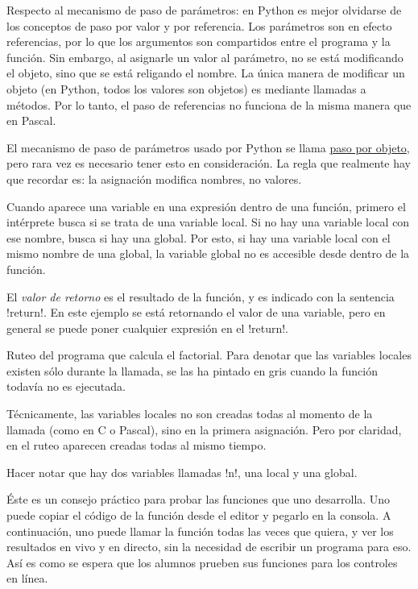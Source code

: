 \documentclass[10pt]{article}
\begin{document}
  Respecto al mecanismo de paso de parámetros:
  en Python es mejor olvidarse de los conceptos de paso por valor y por referencia.
  Los parámetros son en efecto referencias,
  por lo que los argumentos son compartidos entre el programa y la función.
  Sin embargo, al asignarle un valor al parámetro,
  no se está modificando el objeto, sino que se está religando el nombre.
  La única manera de modificar un objeto (en Python, todos los valores son objetos)
  es mediante llamadas a métodos.
  Por lo tanto, el paso de referencias no funciona de la misma manera que en Pascal.

  El mecanismo de paso de parámetros usado por Python
  se llama \href{http://effbot.org/zone/call-by-object.htm}{paso por objeto},
  pero rara vez es necesario tener esto en consideración.
  La regla que realmente hay que recordar es:
  la asignación modifica nombres, no valores.

  Cuando aparece una variable en una expresión dentro de una función,
  primero el intérprete busca si se trata de una variable local.
  Si no hay una variable local con ese nombre,
  busca si hay una global.
  Por esto,
  si hay una variable local con el mismo nombre de una global,
  la variable global no es accesible desde dentro de la función.

  El \emph{valor de retorno} es el resultado de la función,
  y es indicado con la sentencia \li!return!.
  En este ejemplo se está retornando el valor de una variable,
  pero en general se puede poner cualquier expresión
  en el \li!return!.


  Ruteo del programa que calcula el factorial.
  Para denotar que las variables locales existen
  sólo durante la llamada,
  se las ha pintado en gris cuando la función todavía no es ejecutada.

  Técnicamente, las variables locales no son creadas todas
  al momento de la llamada (como en C o Pascal),
  sino en la primera asignación.
  Pero por claridad,
  en el ruteo aparecen creadas todas al mismo tiempo.

  Hacer notar que hay dos variables llamadas \li!n!, una local y una global.


  Éste es un consejo práctico para probar las funciones que uno desarrolla.
  Uno puede copiar el código de la función desde el editor
  y pegarlo en la consola.
  A continuación,
  uno puede llamar la función todas las veces que quiera,
  y ver los resultados en vivo y en directo,
  sin la necesidad de escribir un programa para eso.
  Así es como se espera que los alumnos
  prueben sus funciones para los controles en línea.
\end{document}
